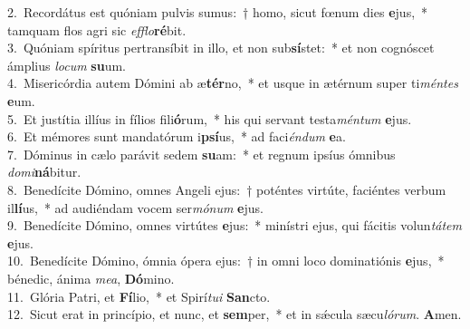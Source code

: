 {2.~}Recordátus est quóniam pulvis sumus:~† homo, sicut fœnum dies \textbf{e}jus,~* tamquam flos agri sic \textit{ef}\textit{flo}\textbf{ré}bit.\\
{3.~}Quóniam spíritus pertransíbit in illo, et non sub\textbf{sí}stet:~* et non cognóscet ámplius \textit{lo}\textit{cum} \textbf{su}um.\\
{4.~}Misericórdia autem Dómini ab æ\textbf{tér}no,~* et usque in ætérnum super ti\textit{mén}\textit{tes} \textbf{e}um.\\
{5.~}Et justítia illíus in fílios fili\textbf{ó}rum,~* his qui servant testa\textit{mén}\textit{tum} \textbf{e}jus.\\
{6.~}Et mémores sunt mandatórum i\textbf{psí}us,~* ad faci\textit{én}\textit{dum} \textbf{e}a.\\
{7.~}Dóminus in cælo parávit sedem \textbf{su}am:~* et regnum ipsíus ómnibus \textit{do}\textit{mi}\textbf{ná}bitur.\\
{8.~}Benedícite Dómino, omnes Angeli ejus:~† poténtes virtúte, faciéntes verbum il\textbf{lí}us,~* ad audiéndam vocem ser\textit{mó}\textit{num} \textbf{e}jus.\\
{9.~}Benedícite Dómino, omnes virtútes \textbf{e}jus:~* minístri ejus, qui fácitis volun\textit{tá}\textit{tem} \textbf{e}jus.\\
{10.~}Benedícite Dómino, ómnia ópera ejus:~† in omni loco dominatiónis \textbf{e}jus,~* bénedic, ánima \textit{me}\textit{a}, \textbf{Dó}mino.\\
{11.~}Glória Patri, et \textbf{Fí}lio,~* et Spirí\textit{tu}\textit{i} \textbf{San}cto.\\
{12.~}Sicut erat in princípio, et nunc, et \textbf{sem}per,~* et in sǽcula sæcu\textit{ló}\textit{rum}. \textbf{A}men.\\
